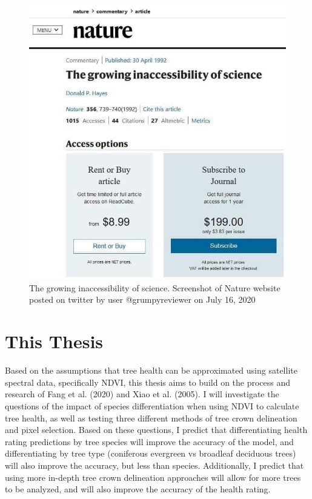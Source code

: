 \documentclass[12pt,twoside]{reedthesis}
\begin{document}
\begin{figure}

{\centering \includegraphics[width=0.75\linewidth]{figure/science_inaccessable} 

}

\caption[The growing inaccessibility of science]{The growing inaccessibility of science. Screenshot of Nature website posted on twitter by user @grumpyreviewer on July 16, 2020}\label{fig:twitter-pic}
\end{figure}
\hypertarget{this-thesis}{%
\section{This Thesis}\label{this-thesis}}

Based on the assumptions that tree health can be approximated using
satellite spectral data, specifically NDVI, this thesis aims to
build on the process and research of Fang et al. (2020) and Xiao et al. (2005). I will
investigate the questions of the impact of species differentiation when
using NDVI to calculate tree health, as well as testing three different methods of tree
crown delineation and pixel selection. Based on these
questions, I predict that differentiating health rating predictions by
tree species will improve the accuracy of the model, and differentiating
by tree type (coniferous evergreen vs broadleaf deciduous trees) will
also improve the accuracy, but less than species. Additionally, I
predict that using more in-depth tree crown delineation approaches will
allow for more trees to be analyzed, and will also improve the accuracy
of the health rating.
\end{document}
